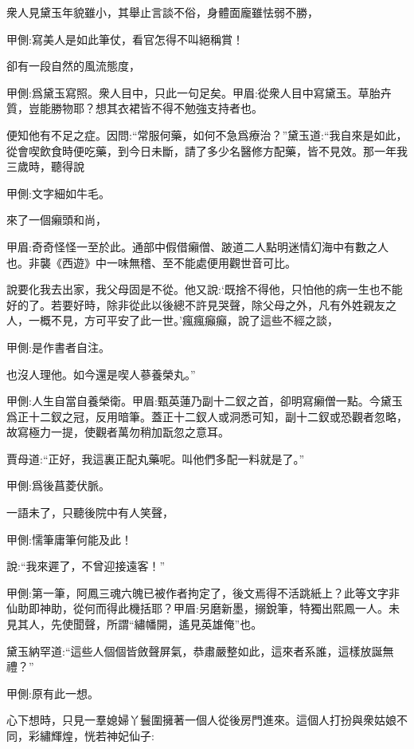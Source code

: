 \begin{parag}
    衆人見黛玉年貌雖小，其舉止言談不俗，身體面龐雖怯弱不勝，\begin{note}甲側:寫美人是如此筆仗，看官怎得不叫絕稱賞！\end{note}卻有一段自然的風流態度，\begin{note}甲側:爲黛玉寫照。衆人目中，只此一句足矣。甲眉:從衆人目中寫黛玉。草胎卉質，豈能勝物耶？想其衣裙皆不得不勉強支持者也。\end{note}便知他有不足之症。因問:“常服何藥，如何不急爲療治？”黛玉道:“我自來是如此，從會喫飲食時便吃藥，到今日未斷，請了多少名醫修方配藥，皆不見效。那一年我三歲時，聽得說\begin{note}甲側:文字細如牛毛。\end{note}來了一個癩頭和尚，\begin{note}甲眉:奇奇怪怪一至於此。通部中假借癩僧、跛道二人點明迷情幻海中有數之人也。非襲《西遊》中一味無稽、至不能處便用觀世音可比。\end{note}說要化我去出家，我父母固是不從。他又說:‘既捨不得他，只怕他的病一生也不能好的了。若要好時，除非從此以後總不許見哭聲，除父母之外，凡有外姓親友之人，一概不見，方可平安了此一世。’瘋瘋癲癲，說了這些不經之談，\begin{note}甲側:是作書者自注。\end{note}也沒人理他。如今還是喫人蔘養榮丸。”\begin{note}甲側:人生自當自養榮衛。甲眉:甄英蓮乃副十二釵之首，卻明寫癩僧一點。今黛玉爲正十二釵之冠，反用暗筆。蓋正十二釵人或洞悉可知，副十二釵或恐觀者忽略，故寫極力一提，使觀者萬勿稍加翫忽之意耳。\end{note}賈母道:“正好，我這裏正配丸藥呢。叫他們多配一料就是了。”\begin{note}甲側:爲後菖菱伏脈。\end{note}
\end{parag}


\begin{parag}
    一語未了，只聽後院中有人笑聲，\begin{note}甲側:懦筆庸筆何能及此！\end{note}說:“我來遲了，不曾迎接遠客！”\begin{note}甲側:第一筆，阿鳳三魂六魄已被作者拘定了，後文焉得不活跳紙上？此等文字非仙助即神助，從何而得此機括耶？甲眉:另磨新墨，搦銳筆，特獨出熙鳳一人。未見其人，先使聞聲，所謂“繡幡開，遙見英雄俺”也。\end{note}黛玉納罕道:“這些人個個皆斂聲屏氣，恭肅嚴整如此，這來者系誰，這樣放誕無禮？”\begin{note}甲側:原有此一想。\end{note}心下想時，只見一羣媳婦丫鬟圍擁著一個人從後房門進來。這個人打扮與衆姑娘不同，彩繡輝煌，恍若神妃仙子:
\end{parag}

